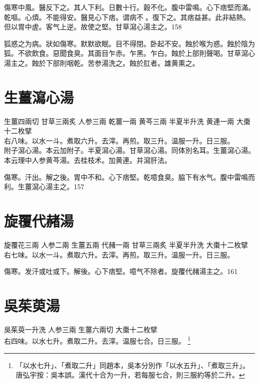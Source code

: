 傷寒中風。醫反下之。其人下利。日數十行。穀不化。腹中雷鳴。心下痞堅而滿。乾嘔。心煩。不{\khaaitp 能}得安。醫見心下痞。谓病不{\sungtpii 𥁞}。復下之。其痞益甚。此非結熱。但以胃中虗。客气上逆。故使之堅。甘草瀉心湯主之。158

狐惑之为病。狀如傷寒。默默欲眠。目不得閉。卧起不安。蝕於喉为惑。蝕於陰为狐。不欲飲食。惡聞食臭。其面目乍赤。乍黑。乍白。蝕於上部則聲喝。甘草瀉心湯主之。蝕於下部則咽乾。苦参湯洗之。蝕於肛者。雄黄熏之。

\section{生薑瀉心湯}

生薑{\scriptsize 四兩切} 甘草{\scriptsize 三兩炙} 人参{\scriptsize 三兩} 乾薑{\scriptsize 一兩} 黄芩{\scriptsize 三兩} 半夏{\scriptsize 半升洗} 黄連{\scriptsize 一兩} 大棗{\scriptsize 十二枚擘}\\
右八味。以水一斗。煮取六升。去滓。再煎。取三升。温服一升。日三服。\\
附子瀉心湯。本云加附子。半夏瀉心湯。甘草瀉心湯。同体別名耳。生薑瀉心湯。本云理中人参黄芩湯。去桂枝术。加黄連。并瀉肝法。

傷寒。汗出。解之後。胃中不和。心下痞堅。乾噫食臭。脇下有水气。腹中雷鳴而利。生薑瀉心湯主之。157

\section{旋覆代赭湯}

旋覆花{\scriptsize 三兩} 人参{\scriptsize 二兩} 生薑{\scriptsize 五兩} 代赭{\scriptsize 一兩} 甘草{\scriptsize 三兩炙} 半夏{\scriptsize 半升洗} 大棗{\scriptsize 十二枚擘}\\
右七味。以水一斗。煮取六升。去滓。再煎。取三升。温服一升。日三服。

傷寒。发汗{\khaaitp 或}吐{\khaaitp 或}下。解後。心下痞堅。噫气不除者。旋覆代赭湯主之。161

\section{吳茱萸湯}

吳茱萸{\scriptsize 一升{\khaaitp 洗}} 人参{\scriptsize 三兩} 生薑{\scriptsize 六兩切} 大棗{\scriptsize 十二枚擘}\\
右四味。以水七升。煮取二升。去滓。温服七合。日三服。{\zhaoben}
	\footnote{
		「以水七升」、「煮取二升」同趙本，吳本分別作「以水五升」、「煮取三升」。唐弘宇按：吳本誤。漢代十合为一升，若每服七合，則三服約等於二升。
	}

